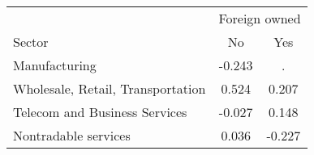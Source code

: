 \begin{tabular}{lcc}
\toprule
 & \multicolumn{2}{c}{Foreign owned} \\
\cmidrule(lr){2-3}
Sector & No & Yes \\
\midrule
Manufacturing & -0.243 & . \\
Wholesale, Retail, Transportation & 0.524 & 0.207 \\
Telecom and Business Services & -0.027 & 0.148 \\
Nontradable services & 0.036 & -0.227 \\
\bottomrule
\end{tabular}
